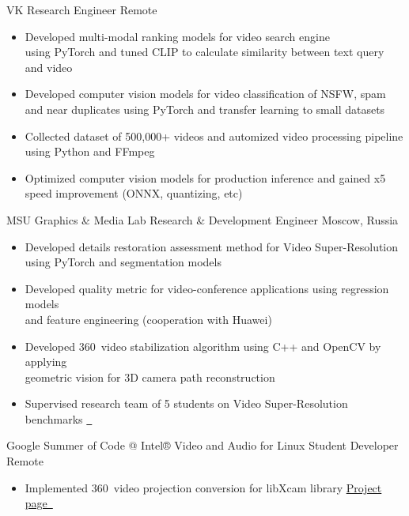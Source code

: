 \documentclass{tccv}
\newcommand{\sphere}{360\textdegree~}
\begin{document}
\begin{eventlist}

     {VK}
     {Research Engineer}
     {Remote}
\begin{itemize}
     \item Developed multi-modal ranking models for video search engine \\ using PyTorch and tuned CLIP to calculate similarity between text query and video
     \item Developed computer vision models for video classification of NSFW, spam \\ and near duplicates using PyTorch and transfer learning to small datasets
     \item Collected dataset of 500,000+ videos and automized video processing pipeline \\ using Python and FFmpeg
     \item Optimized computer vision models for production inference and gained x5 \\ speed improvement (ONNX, quantizing, etc)
\end{itemize}

     {MSU Graphics \& Media Lab}
     {Research \& Development Engineer}
     {Moscow, Russia}
\begin{itemize}
     \item Developed details restoration assessment method for Video Super-Resolution \\ using PyTorch and segmentation models
     \item Developed quality metric for video-conference applications using regression models \\ and feature engineering  (cooperation with Huawei) 
     \item Developed \sphere video stabilization algorithm using C++ and OpenCV by applying \\ geometric vision for 3D camera path reconstruction
     \item Supervised research team of 5 students on Video Super-Resolution benchmarks \href{https://videoprocessing.ai/benchmarks/video-super-resolution.html}{~\faExternalLink*}
\end{itemize}

     {Google Summer of Code @ Intel® Video and Audio for Linux}
     {Student Developer}
     {Remote}
\begin{itemize}
     \item Implemented \sphere video projection conversion for libXcam library\hfill
     \href{https://unishift.github.io/project/2021-08-20-gsoc-libxcam}{Project page~\faExternalLink*}
\end{itemize}


\end{eventlist}
\end{document}
